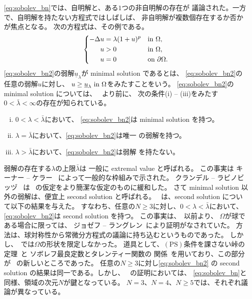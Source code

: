 \eqref{eq:sobolev_bn}では、自明解と、ある$1$つの非自明解の存在が
議論された。一方で、自明解を持たない方程式ではしばしば、
非自明解が複数個存在するか否かが焦点となる。
次の方程式は、その例である。
\begin{align}
 \left\{
 \begin{aligned}
  -\Delta u &= \lambda (1 + u)^p  & &\text{in}~ \Omega,  \\
  u &> 0 & &\text{in}~ \Omega, \\
  u &= 0 & &\text{on}~ \partial\Omega.
 \end{aligned}
 \right. \label{eq:sobolev_bn2}
\end{align}
\eqref{eq:sobolev_bn2}の弱解$\underline{u}_\lambda$が
minimal solution であるとは、
\eqref{eq:sobolev_bn2}の任意の弱解$u$に対し、
$u \geq \underline{u}_\lambda ~\text{in}~ \Omega$をみたすことをいう。
\eqref{eq:sobolev_bn2}の minimal solution については、
\cite{MR709644}~より前に、
次の条件(i) -- (iii)をみたす$0 < \bar{\lambda} < \infty$の存在が知られている。
\begin{enumerate}[(i)]
 \item $0 < \lambda < \bar{\lambda}$において、
       \eqref{eq:sobolev_bn2}は minimal solution を持つ。
 \item $\lambda = \bar{\lambda}$において、\eqref{eq:sobolev_bn2}は唯一
       の弱解を持つ。
 \item $\lambda > \bar{\lambda}$において、\eqref{eq:sobolev_bn2}は弱解
       を持たない。
\end{enumerate}
弱解の存在する$\lambda$の上限$\bar{\lambda}$は
一般に extremal value と呼ばれる。
この事実は
キーナー -- ケラー \cite{MR0346305}~によって一般的な枠組みで示された。
クランデル -- ラビノビッヅ \cite{MR0382848}~は
\cite{MR0346305}~の仮定をより簡潔な仮定のものに緩和した。
さて minimal solution 以外の弱解は、便宜上 second solution と呼ばれる。
\cite{MR709644}~は、second solution について以下の結果を与えた。
すなわち、任意の$N \geq 3$に対し、$0 < \lambda < \bar{\lambda}$において、
\eqref{eq:sobolev_bn2}は second solution を持つ。
この事実は、\cite{MR709644}~以前より、
$\Omega$が球である場合に限っては、
ジョゼフ -- ラングレン\cite{MR0340701}~により証明がなされていた。
方法は、球対称性から常微分方程式の議論に持ち込むというものであった。
しかし、\cite{MR709644}~では$\Omega$の形状を限定しなかった。
道具として、$(\mathrm{PS})$条件を課さない峠の定理~\cite{MR0370183}と
ソボレフ最良定数とタレンティー関数の
関係~\cite{MR0463908}を用いており、この部分が
\cite{MR709644}~の新しいところであった。
任意の$N \geq 3$に対し\eqref{eq:sobolev_bn2}
の second solution の結果は同一である。しかし、
\cite{MR709644}~の証明においては、
\eqref{eq:sobolev_bn}と同様、領域の次元$N$が鍵となっている。
$N = 3$、$N = 4$、$N \geq 5$では、それぞれ議論が異なっている。

